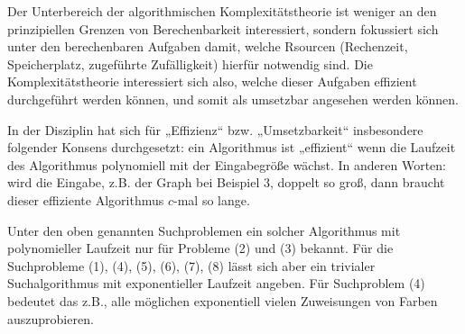 Der Unterbereich der algorithmischen Komplexitätstheorie ist weniger an den prinzipiellen Grenzen von Berechenbarkeit interessiert, sondern fokussiert sich unter den berechenbaren Aufgaben damit, welche Rsourcen (Rechenzeit, Speicherplatz, zugeführte Zufälligkeit) hierfür notwendig sind. Die Komplexitätstheorie interessiert sich also, welche dieser Aufgaben effizient durchgeführt werden können, und somit als umsetzbar angesehen werden können. 

In der Disziplin hat sich für „Effizienz“ bzw. „Umsetzbarkeit“ insbesondere folgender Konsens durchgesetzt: ein Algorithmus ist „effizient“ wenn die Laufzeit des Algorithmus polynomiell mit der Eingabegröße wächst. In anderen Worten: wird die Eingabe, z.B. der Graph bei Beispiel 3, doppelt so groß, dann braucht dieser effiziente Algorithmus $c$-mal so lange.

Unter den oben genannten Suchproblemen ein solcher Algorithmus mit polynomieller Laufzeit nur für Probleme (2) und (3) bekannt.
Für die Suchprobleme (1), (4), (5), (6), (7), (8) lässt sich aber ein trivialer Suchalgorithmus mit exponentieller Laufzeit angeben. Für Suchproblem (4) bedeutet das z.B., alle möglichen exponentiell vielen Zuweisungen von Farben auszuprobieren.

